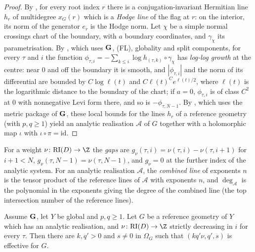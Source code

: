 \begin{proof}
By , for every root index $r$ there is a conjugation-invariant
Hermitian line $h_r$ of multidegree $x_G(r)$ which is a \emph{Hodge line} of the flag at $r$: on the interior, its
norm of the generator $e_r$ is the Hodge norm. Let $\chi$ be a simple normal crossings chart of the boundary, with
$a$ boundary coordinates, and $\gamma_\chi$ its parametrisation. By
, which uses $\mathbf G$, (FL), globality and split components, for
every $\tau$ and $i$ the function $\phi_{\tau,i}=-\sum_{k\le i}\log h_{(\tau,k)}\circ\gamma_\chi$ has
\emph{log-log growth} at the centre: near $0$ and off the boundary it is smooth, and $|\phi_{\tau,i}|$ and the
norm of its differential are bounded by $C\log\ell(t)$ and $C\ell(t)^Ce^{\ell(t)/2}$, where $\ell(t)$ is the
logarithmic distance to the boundary of the chart; if $a=0$, $\phi_{\tau,i}$ is of class $C^2$ at $0$ with
nonnegative Levi form there, and so is $-\phi_{\tau,N-1}$. By , which uses
the metric package of $\mathbf G$, these local bounds for the lines $h_r$ of a reference geometry (with $p,q\ge1$)
yield an analytic realisation $\mathcal A$ of $G$ together with a holomorphic map $\iota$ with
$\iota\circ\pi=\mathrm{id}$.
\end{proof}

For a weight $\nu\colon\towergeoRI(D)\to\Z$ the \emph{gaps} are $g_\nu(\tau,i)=\nu(\tau,i)-\nu(\tau,i+1)$ for
$i+1<N$, $g_\nu(\tau,N-1)=\nu(\tau,N-1)$, and $g_\nu=0$ at the further index of the analytic system. For
an analytic realisation $\mathcal A$, the \emph{combined line} of exponents $n$ is the tensor product of the
reference lines of $\mathcal A$ with exponents $n$, and $\deg_{\mathcal A}$ is the polynomial in the exponents giving
the degree of the combined line (the top intersection number of the reference lines).

\begin{proposition}\label{pf:towergeo:exeff}
Assume $\mathbf G$, let $Y$ be global and $p,q\ge1$. Let $G$ be a reference geometry of $Y$ which has an
analytic realisation, and $\nu\colon\towergeoRI(D)\to\Z$ strictly decreasing in $i$ for every $\tau$. Then there
are $k,q'>0$ and $s\ne0$ in $\Omega_G$ such that $(kq'\nu,q',s)$ is effective for $G$.
\end{proposition}

